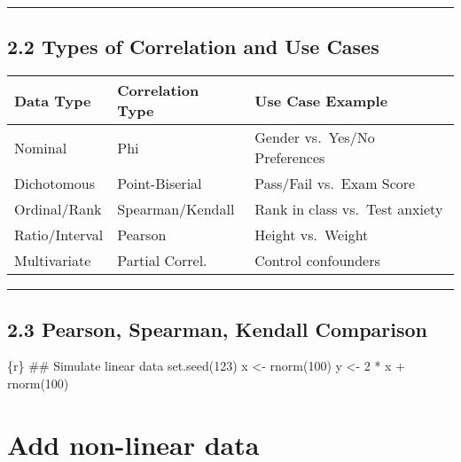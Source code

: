 \documentclass[
  letterpaper,
  DIV=11,
  numbers=noendperiod]{scrreprt}
\begin{document}
\begin{center}\rule{0.5\linewidth}{0.5pt}\end{center}

\subsection{2.2 Types of Correlation and Use
Cases}\label{types-of-correlation-and-use-cases}

\begin{longtable}[]{@{}
  >{\raggedright\arraybackslash}p{}
  >{\raggedright\arraybackslash}p{}
  >{\raggedright\arraybackslash}p{}@{}}
\toprule\noalign{}
\begin{minipage}[b]{\linewidth}\raggedright
Data Type
\end{minipage} & \begin{minipage}[b]{\linewidth}\raggedright
Correlation Type
\end{minipage} & \begin{minipage}[b]{\linewidth}\raggedright
Use Case Example
\end{minipage} \\
\midrule\noalign{}
\endhead
\bottomrule\noalign{}
\endlastfoot
Nominal & Phi & Gender vs.~Yes/No Preferences \\
Dichotomous & Point-Biserial & Pass/Fail vs.~Exam Score \\
Ordinal/Rank & Spearman/Kendall & Rank in class vs.~Test anxiety \\
Ratio/Interval & Pearson & Height vs.~Weight \\
Multivariate & Partial Correl. & Control confounders \\
\end{longtable}

\begin{center}\rule{0.5\linewidth}{0.5pt}\end{center}

\subsection{2.3 Pearson, Spearman, Kendall
Comparison}\label{pearson-spearman-kendall-comparison}

\{r\} \#\# Simulate linear data set.seed(123) x \textless- rnorm(100) y
\textless- 2 * x + rnorm(100)

\section{Add non-linear data}\label{add-non-linear-data}
\end{document}
